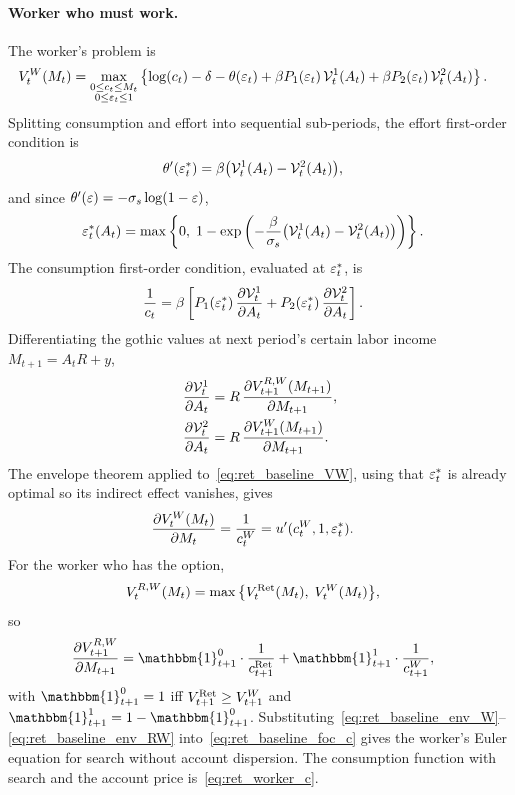 \paragraph{Worker who must work.}
The worker's problem is
\begin{align}
	V_t^{W}(M_t)
	&= \max_{\substack{0\le c_t\le M_t\\ 0\le\varepsilon_t\le 1}}
	\left\{
		\log(c_t)-\delta-\theta(\varepsilon_t)
		+\beta P_1(\varepsilon_t)\,\mathcal{V}_t^{1}(A_t)
		+\beta P_2(\varepsilon_t)\,\mathcal{V}_t^{2}(A_t)
	\right\}.
	\label{eq:ret_baseline_VW}
\end{align}
Splitting consumption and effort into sequential sub-periods, the effort first-order condition is
\begin{align}
	\theta'(\varepsilon_t^{\ast})
	&= \beta\bigl(\mathcal{V}_t^{1}(A_t)-\mathcal{V}_t^{2}(A_t)\bigr),
\end{align}
and since $\theta'(\varepsilon)=-\sigma_s\log(1-\varepsilon)$,
\begin{align}
	\varepsilon_t^{\ast}(A_t)
	&= \max\left\{0,\;
		1-\exp\left(
			-\frac{\beta}{\sigma_s}
			\bigl(\mathcal{V}_t^{1}(A_t)-\mathcal{V}_t^{2}(A_t)\bigr)
		\right)
	\right\}.
	\label{eq:ret_baseline_effort}
\end{align}
The consumption first-order condition, evaluated at $\varepsilon_t^{\ast}$, is
\begin{align}
	\frac{1}{c_t}
	&= \beta\left[
		P_1(\varepsilon_t^{\ast})\,\frac{\partial\mathcal{V}_t^{1}}{\partial A_t}
		+P_2(\varepsilon_t^{\ast})\,\frac{\partial\mathcal{V}_t^{2}}{\partial A_t}
	\right].
	\label{eq:ret_baseline_foc_c}
\end{align}
Differentiating the gothic values at next period's certain labor income $M_{t+1}=A_t R+y$,
\begin{align}
	\frac{\partial\mathcal{V}_t^{1}}{\partial A_t}
	&= R\,
		\frac{\partial V_{t+1}^{R,W}(M_{t+1})}{\partial M_{t+1}},
	\\
	\frac{\partial\mathcal{V}_t^{2}}{\partial A_t}
	&= R\,
		\frac{\partial V_{t+1}^{W}(M_{t+1})}{\partial M_{t+1}}.
\end{align}
The envelope theorem applied to~\eqref{eq:ret_baseline_VW}, using that $\varepsilon_t^{\ast}$ is already optimal so its indirect effect vanishes, gives
\begin{align}
	\frac{\partial V_t^{W}(M_t)}{\partial M_t}
	&= \frac{1}{c_t^{W}}
	= u'(c_t^{W},1,\varepsilon_t^{\ast}).
	\label{eq:ret_baseline_env_W}
\end{align}
For the worker who has the option,
\begin{align}
	V_t^{R,W}(M_t)
	&= \max\big\{V_t^{\mathrm{Ret}}(M_t),\; V_t^{W}(M_t)\big\},
\end{align}
so
\begin{align}
	\frac{\partial V_{t+1}^{R,W}}{\partial M_{t+1}}
	&= \mathbbm{1}_{t+1}^{0}\cdot\frac{1}{c_{t+1}^{\Ret}}
	+\mathbbm{1}_{t+1}^{1}\cdot\frac{1}{c_{t+1}^{W}},
	\label{eq:ret_baseline_env_RW}
\end{align}
with $\mathbbm{1}_{t+1}^{0}=1$ iff $V_{t+1}^{\mathrm{Ret}}\ge V_{t+1}^{W}$ and $\mathbbm{1}_{t+1}^{1}=1-\mathbbm{1}_{t+1}^{0}$. Substituting~\eqref{eq:ret_baseline_env_W}--\eqref{eq:ret_baseline_env_RW} into~\eqref{eq:ret_baseline_foc_c} gives the worker's Euler equation for search without account dispersion. The consumption function with search and the account price is~\eqref{eq:ret_worker_c}.

